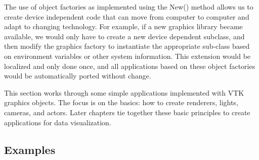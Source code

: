 The use of object factories as implemented using the New() method allows us to create device independent code that can move from computer to computer and adapt to changing technology. For example, if a new graphics library became available, we would only have to create a new device dependent subclass, and then modify the graphics factory to instantiate the appropriate sub-class based on environment variables or other system information. This extension would be localized and only done once, and all applications based on these object factories would be automatically ported without change.

This section works through some simple applications implemented with VTK graphics objects. The focus is on the basics: how to create renderers, lights, cameras, and actors. Later chapters tie together these basic principles to create applications for data visualization.

\subsection{Examples}

